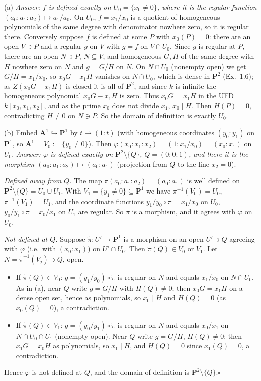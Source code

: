 \documentclass[11pt]{article}
\begin{document}
(a) \emph{Answer: $f$ is defined exactly on $U_0=\{x_0\neq0\}$, where it is the regular function $(a_0:a_1:a_2)\mapsto a_1/a_0$.} On $U_0$, $f=x_1/x_0$ is a quotient of homogeneous polynomials of the same degree with denominator nowhere zero, so it is regular there. Conversely suppose $f$ is defined at some $P$ with $x_0(P)=0$: there are an open $V\ni P$ and a regular $g$ on $V$ with $g=f$ on $V\cap U_0$. Since $g$ is regular at $P$, there are an open $N\ni P$, $N\subseteq V$, and homogeneous $G,H$ of the same degree with $H$ nowhere zero on $N$ and $g=G/H$ on $N$. On $N\cap U_0$ (nonempty open) we get $G/H=x_1/x_0$, so $x_0G-x_1H$ vanishes on $N\cap U_0$, which is dense in $\mathbf P^2$ (Ex.~1.6); as $Z(x_0G-x_1H)$ is closed it is all of $\mathbf P^2$, and since $k$ is infinite the homogeneous polynomial $x_0G-x_1H$ is zero. Thus $x_0G=x_1H$ in the UFD $k[x_0,x_1,x_2]$, and as the prime $x_0$ does not divide $x_1$, $x_0\mid H$. Then $H(P)=0$, contradicting $H\ne0$ on $N\ni P$. So the domain of definition is exactly $U_0$.

(b) Embed $\mathbf A^1\hookrightarrow\mathbf P^1$ by $t\mapsto(1:t)$ (with homogeneous coordinates $(y_0:y_1)$ on $\mathbf P^1$, so $\mathbf A^1=V_0:=\{y_0\ne0\}$). Then $\varphi(x_0:x_1:x_2)=(1:x_1/x_0)=(x_0:x_1)$ on $U_0$. \emph{Answer: $\varphi$ is defined exactly on $\mathbf P^2\setminus\{Q\}$, $Q=(0:0:1)$, and there it is the morphism $(a_0:a_1:a_2)\mapsto(a_0:a_1)$} (projection from $Q$ to the line $x_2=0$).

\emph{Defined away from $Q$.} The map $\pi(a_0:a_1:a_2)=(a_0:a_1)$ is well defined on $\mathbf P^2\setminus\{Q\}=U_0\cup U_1$. With $V_1=\{y_1\ne0\}\subseteq\mathbf P^1$ we have $\pi^{-1}(V_0)=U_0$, $\pi^{-1}(V_1)=U_1$, and the coordinate functions $y_1/y_0\circ\pi=x_1/x_0$ on $U_0$, $y_0/y_1\circ\pi=x_0/x_1$ on $U_1$ are regular. So $\pi$ is a morphism, and it agrees with $\varphi$ on $U_0$.

\emph{Not defined at $Q$.} Suppose $\tilde\pi:U'\to\mathbf P^1$ is a morphism on an open $U'\ni Q$ agreeing with $\varphi$ (i.e.\ with $(x_0:x_1)$) on $U'\cap U_0$. Then $\tilde\pi(Q)\in V_0$ or $V_1$. Let $N=\tilde\pi^{-1}(V_j)\ni Q$, open.
\begin{itemize}
\item If $\tilde\pi(Q)\in V_0$: $g=(y_1/y_0)\circ\tilde\pi$ is regular on $N$ and equals $x_1/x_0$ on $N\cap U_0$. As in (a), near $Q$ write $g=G/H$ with $H(Q)\ne0$; then $x_0G=x_1H$ on a dense open set, hence as polynomials, so $x_0\mid H$ and $H(Q)=0$ (as $x_0(Q)=0$), a contradiction.
\item If $\tilde\pi(Q)\in V_1$: $g=(y_0/y_1)\circ\tilde\pi$ is regular on $N$ and equals $x_0/x_1$ on $N\cap U_0\cap U_1$ (nonempty open). Near $Q$ write $g=G/H$, $H(Q)\ne0$; then $x_1G=x_0H$ as polynomials, so $x_1\mid H$, and $H(Q)=0$ since $x_1(Q)=0$, a contradiction.
\end{itemize}
Hence $\varphi$ is not defined at $Q$, and the domain of definition is $\mathbf P^2\setminus\{Q\}$.\hfill$\square$
\end{document}
